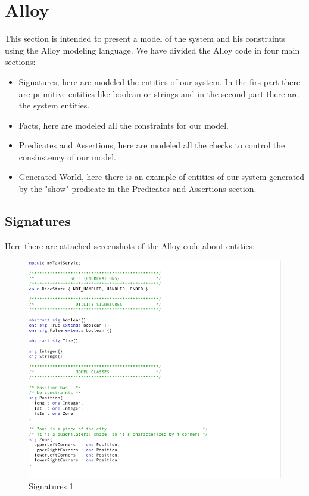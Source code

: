\section{Alloy}
	This section is intended to present a model of the system and his constraints using the Alloy modeling language. We have divided the Alloy code in four main sections:
		\begin{itemize}
			\item Signatures, here are modeled the entities of our system. In the firs part there are primitive entities like boolean or strings and in the second part there are the system entities.
			\item Facts, here are modeled all the constraints for our model.
			\item Predicates and Assertions, here are modeled all the checks to control the consinstency of our model.
			\item Generated World, here there is an example of entities of our system generated by the "show" predicate in the Predicates and Assertions section.
		\end{itemize}

		\subsection{Signatures}
		Here there are attached screenshots of the Alloy code about entities:

				\begin{figure}[H]
					\centering
					\includegraphics[width=\textwidth, scale=0.5]{IMG/ALLOY/SIG_1.png}
					\caption{Signatures 1}\label{sec:FigureSignatures1}
				\end{figure}


